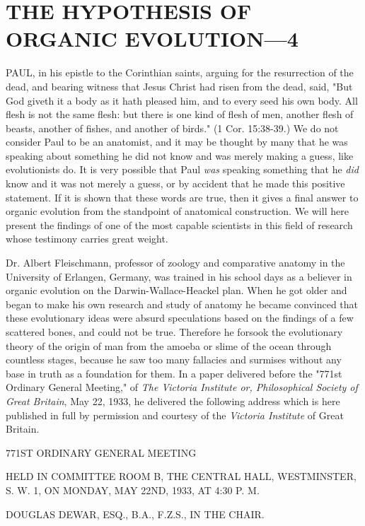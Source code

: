\chapter{THE HYPOTHESIS OF ORGANIC EVOLUTION—4}

PAUL, in his epistle to the Corinthian saints, arguing for the resurrection of the dead, and
bearing witness that Jesus Christ had risen from the dead, said, "But God giveth it a body as
it hath pleased him, and to every seed his own body. All flesh is not the same flesh: but there
is one kind of flesh of men, another flesh of beasts, another of fishes, and another of birds."
(1 Cor. 15:38-39.) We do not consider Paul to be an anatomist, and it may be thought by
many that he was speaking about something he did not know and was merely making a
guess, like evolutionists do. It is very possible that Paul \textit{was} speaking something that he \textit{did}
know and it was not merely a guess, or by accident that he made this positive statement. If it
is shown that these words are true, then it gives a final answer to organic evolution from the
standpoint of anatomical construction. We will here present the findings of one of the most
capable scientists in this field of research whose testimony carries great weight.

Dr. Albert Fleischmann, professor of zoology and comparative anatomy in the University of
Erlangen, Germany, was trained in his school days as a believer in organic evolution on the
Darwin-Wallace-Heackel plan. When he got older and began to make his own research and
study of anatomy he became convinced that these evolutionary ideas were absurd
speculations based on the findings of a few scattered bones, and could not be true. Therefore
he forsook the evolutionary theory of the origin of man from the amoeba or slime of the
ocean through countless stages, because he saw too many fallacies and surmises without any
base in truth as a foundation for them. In a paper delivered before the "771st Ordinary
General Meeting," of \textit{The Victoria Institute or, Philosophical Society of Great Britain}, May
22, 1933, he delivered the following address which is here published in full by permission
and courtesy of the \textit{Victoria Institute} of Great Britain.

771ST ORDINARY GENERAL MEETING

HELD IN COMMITTEE ROOM B, THE CENTRAL HALL, WESTMINSTER, S. W. 1,
ON MONDAY, MAY 22ND, 1933, AT 4:30 P. M.

DOUGLAS DEWAR, ESQ., B.A., F.Z.S., IN THE CHAIR.

